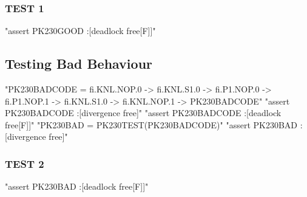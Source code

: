 \subsubsection{TEST 1}

\begin{assert}
"assert PK230GOOD :[deadlock free[F]]"
\end{assert}

\subsection{Testing Bad Behaviour}

\begin{assert}
"PK230BADCODE = fi.KNL.NOP.0 -> fi.KNL.S1.0 -> fi.P1.NOP.0 -> fi.P1.NOP.1 -> fi.KNL.S1.0 -> fi.KNL.NOP.1 -> PK230BADCODE"
\also "assert PK230BADCODE :[divergence free]"
\also "assert PK230BADCODE :[deadlock free[F]]"
\also "PK230BAD = PK230TEST(PK230BADCODE)"
\also "assert PK230BAD :[divergence free]"
\end{assert}


\subsubsection{TEST 2}
\begin{assert}
"assert PK230BAD :[deadlock free[F]]"
\end{assert}
